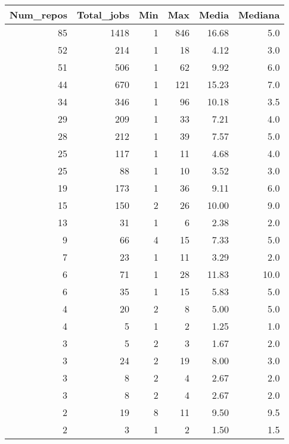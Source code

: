 \begin{tabular}{rrrrrr}
\toprule
 Num\_repos &  Total\_jobs &  Min &  Max &  Media &  Mediana \\
\midrule
        85 &        1418 &    1 &  846 &  16.68 &      5.0 \\
        52 &         214 &    1 &   18 &   4.12 &      3.0 \\
        51 &         506 &    1 &   62 &   9.92 &      6.0 \\
        44 &         670 &    1 &  121 &  15.23 &      7.0 \\
        34 &         346 &    1 &   96 &  10.18 &      3.5 \\
        29 &         209 &    1 &   33 &   7.21 &      4.0 \\
        28 &         212 &    1 &   39 &   7.57 &      5.0 \\
        25 &         117 &    1 &   11 &   4.68 &      4.0 \\
        25 &          88 &    1 &   10 &   3.52 &      3.0 \\
        19 &         173 &    1 &   36 &   9.11 &      6.0 \\
        15 &         150 &    2 &   26 &  10.00 &      9.0 \\
        13 &          31 &    1 &    6 &   2.38 &      2.0 \\
         9 &          66 &    4 &   15 &   7.33 &      5.0 \\
         7 &          23 &    1 &   11 &   3.29 &      2.0 \\
         6 &          71 &    1 &   28 &  11.83 &     10.0 \\
         6 &          35 &    1 &   15 &   5.83 &      5.0 \\
         4 &          20 &    2 &    8 &   5.00 &      5.0 \\
         4 &           5 &    1 &    2 &   1.25 &      1.0 \\
         3 &           5 &    2 &    3 &   1.67 &      2.0 \\
         3 &          24 &    2 &   19 &   8.00 &      3.0 \\
         3 &           8 &    2 &    4 &   2.67 &      2.0 \\
         3 &           8 &    2 &    4 &   2.67 &      2.0 \\
         2 &          19 &    8 &   11 &   9.50 &      9.5 \\
         2 &           3 &    1 &    2 &   1.50 &      1.5 \\

\end{tabular}
